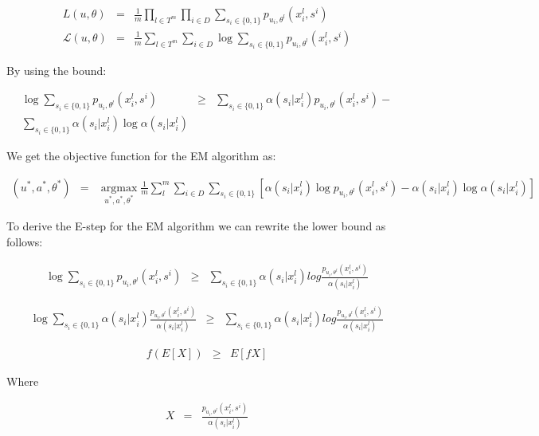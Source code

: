 \documentclass[11pt]{article}
\DeclareMathOperator*{\argmax}{argmax}
\begin{document}
\begin{eqnarray}
L(u, \theta) &=& \frac{1}{m} \prod_{l \in T^m} {\prod_{i \in D}{ \sum_{s_i\in\{0,1\}}{p_{u_i,\theta^l}(x_i^l,s^i)  } } }\\
\mathcal{L}(u, \theta) &=& \frac{1}{m} \sum_{l \in T^m} {\sum_{i \in D}{ \log \sum_{s_i\in\{0,1\}}{p_{u_i,\theta^l}(x_i^l,s^i)  } } }
\end{eqnarray}

By using the bound:

\begin{eqnarray}
\log \sum_{s_i \in \{0,1\}}{ p_{u_i,\theta^l}(x_i^l,s^i)} &\geq& \sum_{s_i \in \{0,1\}}{ \alpha(s_i | x_i^l) p_{u_i,\theta^l}(x_i^l,s^i)} - \\
\sum_{s_i \in \{0,1\}}{ \alpha(s_i | x_i^l)\log\alpha(s_i | x_i^l)}
\end{eqnarray}

We get the objective function for the EM algorithm as: 

\begin{eqnarray}
(u^*,a^*,\theta^*) &=& \argmax\limits_{u^*,a^*,\theta^*} \frac{1}{m} \sum_l^m{ \sum_{i \in D}{ \sum_{s_i \in\{0,1\}}   [\alpha(s_i | x_i^l) \log p_{u_i,\theta^l}(x_i^l,s^i) -  \alpha(s_i | x_i^l)\log\alpha(s_i | x_i^l)] }}
\end{eqnarray}

To derive the E-step for the EM algorithm we can rewrite the lower bound as follows:

\begin{eqnarray}
\log \sum_{s_i \in \{0,1\}}{ p_{u_i,\theta^l}(x_i^l,s^i)} &\geq& \sum_{s_i \in\{0,1\}} \alpha(s_i | x_i^l) 
log{\frac{p_{u_i,\theta^l}(x_i^l,s^i)}{\alpha(s_i | x_i^l) }} 
\end{eqnarray}

\begin{eqnarray}
\log \sum_{s_i \in \{0,1\}}{ \alpha(s_i | x_i^l)  \frac{ p_{u_i,\theta^l}(x_i^l,s^i)}{\alpha(s_i | x_i^l) }} &\geq& \sum_{s_i \in\{0,1\}} \alpha(s_i | x_i^l) 
log{\frac{p_{u_i,\theta^l}(x_i^l,s^i)}{\alpha(s_i | x_i^l) }} 
\end{eqnarray}

\begin{eqnarray}
f(E[X]) &\geq& E[fX]
\end{eqnarray}

Where 

\begin{eqnarray}
X &=& \frac{ p_{u_i,\theta^l}(x_i^l,s^i)}{\alpha(s_i | x_i^l)}
\end{eqnarray}
\end{document}
